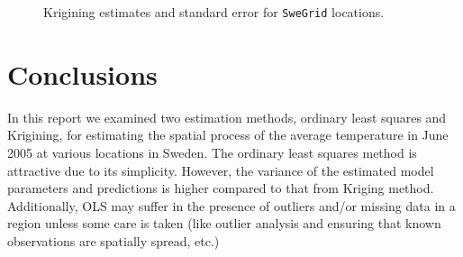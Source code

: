 \documentclass[a4paper,10pt]{article}
\begin{document}
\begin{figure}[H]
\centering
  \qquad
  \caption{Krigining estimates and standard error for \texttt{SweGrid} locations.}
\label{fig:krigresults}
\end{figure}

\section{Conclusions}
In this report we examined two estimation methods, ordinary least squares and Krigining, for estimating the spatial process of the average temperature in June 2005 at various locations in Sweden. The ordinary least squares method is attractive due to its simplicity. However, the variance of the estimated model parameters and predictions is higher compared to that from Kriging method. Additionally, OLS may suffer in the presence of outliers and/or missing data in a region unless some care is taken (like outlier analysis and ensuring that known observations are spatially spread, etc.)
\end{document}
